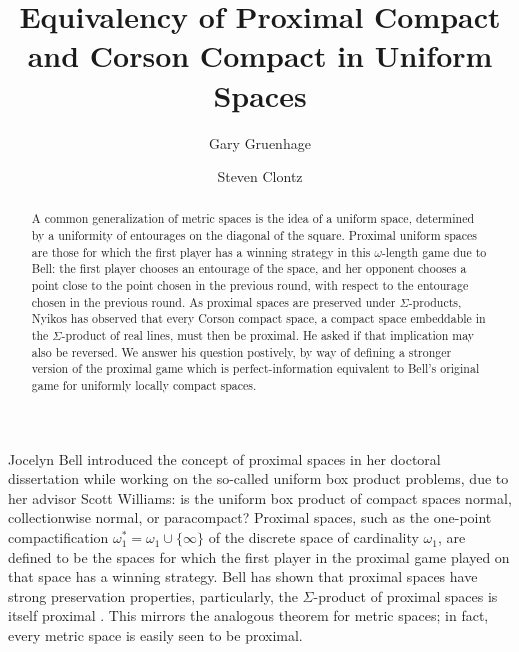 \documentclass{amsart}
\theoremstyle{definition}
\theoremstyle{remark}
\newcommand{\oneptcomp}[1]{{#1}^*}
\newcommand{\<}{\langle}
\renewcommand{\>}{\rangle}
\begin{document}
\title{Equivalency of Proximal Compact and Corson Compact in Uniform Spaces}

\author{Gary Gruenhage}
\address{Department of Mathematics, Auburn University, 
Auburn, AL 36830}


\author{Steven Clontz}
\address{Department of Mathematics, Auburn University, 
Auburn, AL 36830}


\begin{abstract}
A common generalization of metric spaces is the idea of a uniform space, determined by a uniformity of entourages on the diagonal of the square. Proximal uniform spaces are those for which the first player has a winning strategy in this $\omega$-length game due to Bell: the first player chooses an entourage of the space, and her opponent chooses a point close to the point chosen in the previous round, with respect to the entourage chosen in the previous round. As proximal spaces are preserved under $\Sigma$-products, Nyikos has observed that every Corson compact space, a compact space embeddable in the $\Sigma$-product of real lines, must then be proximal. He asked if that implication may also be reversed. We answer his question postively, by way of defining a stronger version of the proximal game which is perfect-information equivalent to Bell's original game for uniformly locally compact spaces.
\end{abstract}


\maketitle



Jocelyn Bell introduced the concept of proximal spaces in her doctoral dissertation while working on the so-called uniform box product problems, due to her advisor Scott Williams: is the uniform box product of compact spaces normal, collectionwise normal, or paracompact? Proximal spaces, such as the one-point compactification $\oneptcomp\omega_1=\omega_1\cup\{\infty\}$ of the discrete space of cardinality $\omega_1$, are defined to be the spaces for which the first player in the proximal game played on that space has a winning strategy. Bell has shown that proximal spaces have strong preservation properties, particularly, the $\Sigma$-product of proximal spaces is itself proximal \cite{b}. This mirrors the analogous theorem for metric spaces; in fact, every metric space is easily seen to be proximal.
\end{document}
